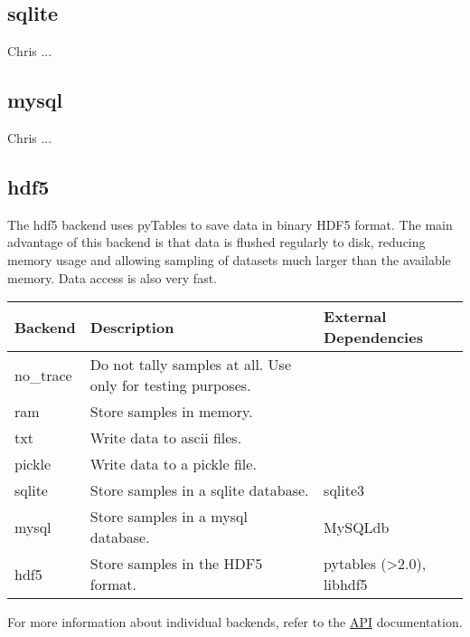 \subsection*{sqlite}
\label{sqlite}

Chris ...



\hypertarget{mysql}{}
\subsection*{mysql}
\label{mysql}

Chris ...



\hypertarget{hdf5}{}
\subsection*{hdf5}
\label{hdf5}

The hdf5 backend uses pyTables to save data in binary HDF5 format. The main advantage of this backend is that data is flushed regularly to disk, reducing memory usage and allowing sampling of datasets much larger than the available memory. Data access is also very fast.

\leavevmode
\begin{longtable}[c]{|p{0.133\locallinewidth}|p{0.447\locallinewidth}|p{0.307\locallinewidth}|}
\hline
\textbf{
Backend
} & \textbf{
Description
} & \textbf{
External Dependencies
} \\
\hline
\endhead

no{\_}trace
 & 
Do not tally samples at all.
Use only for testing purposes.
 &  \\
\hline

ram
 & 
Store samples in memory.
 &  \\
\hline

txt
 & 
Write data to ascii files.
 &  \\
\hline

pickle
 & 
Write data to a pickle file.
 &  \\
\hline

sqlite
 & 
Store samples in a sqlite database.
 & 
sqlite3
 \\
\hline

mysql
 & 
Store samples in a mysql database.
 & 
MySQLdb
 \\
\hline

hdf5
 & 
Store samples in the HDF5 format.
 & 
pytables ({\textgreater}2.0), libhdf5
 \\
\hline
\end{longtable}

For more information about individual backends, refer to the \href{docs/API.pdf}{API} documentation.

\
